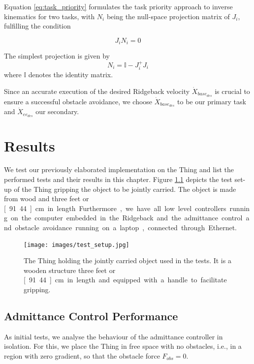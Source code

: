 Equation \ref{eq:task_priority} formulates the task priority approach to inverse kinematics for two tasks, with $N_i$ being the null-space projection matrix of $J_i$, fulfilling the condition

\begin{equation}
J_i N_i = 0
\end{equation}

The simplest projection is given by
\begin{equation}
N_i = \mathbb{I} - J_i^+J_i
\end{equation}
where $\mathbb{I}$ denotes the identity matrix.

Since an accurate execution of the desired Ridgeback velocity $\dot{X}_{base_{des}}$ is crucial to ensure a successful obstacle avoidance, we choose $\dot{X}_{base_{des}}$ to be our primary task and $\dot{X}_{ee_{des}}$ our secondary.

\chapter{Results}
We test our previously elaborated implementation on the Thing and list the performed tests and their results in this chapter. Figure \ref{pics:test_setup} depicts the test set-up of the Thing gripping the object to be jointly carried. The object is made from wood and three feet or \unit[91.44]{cm} in length. Furthermore, we have all low level controllers running on the computer embedded in the Ridgeback and the admittance control and obstacle avoidance running on a laptop, connected through Ethernet.


\begin{figure}[h]
   \centering
   \texttt{[image: images/test\_setup.jpg]}
   \caption{The Thing holding the jointly carried object used in the tests. It is a wooden structure three feet or \unit[91.44]{cm} in length and equipped with a handle to facilitate gripping.}
   \label{pics:test_setup}
\end{figure}

\section{Admittance Control Performance}
	\label{sec:adm_ctrl_performance}
As initial tests, we analyse the behaviour of the admittance controller in isolation. For this, we place the Thing in free space with no obstacles, i.e., in a region with zero gradient, so that the obstacle force $F_{obs} = 0$.

